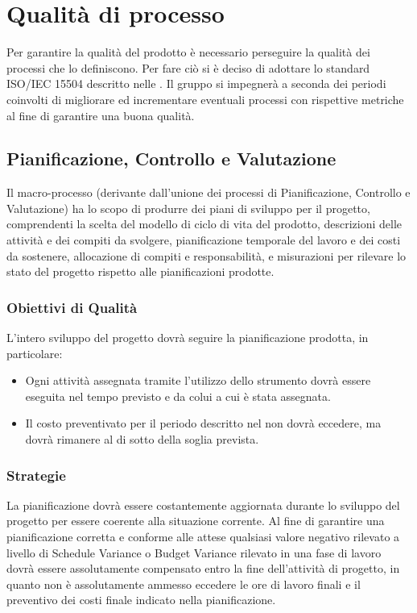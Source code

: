 \newpage

\section{Qualità di processo}
Per garantire la qualità del prodotto è necessario perseguire la qualità dei processi che lo definiscono. Per fare ciò si è deciso di adottare lo standard ISO/IEC 15504 descritto nelle \NdP. Il gruppo \gruppo{} si impegnerà a seconda dei periodi coinvolti di migliorare ed incrementare eventuali processi con rispettive metriche al fine di garantire una buona qualità.


\subsection{Pianificazione, Controllo e Valutazione}
Il macro-processo (derivante dall’unione dei processi di Pianificazione, Controllo e Valutazione) ha lo scopo di produrre dei piani di sviluppo per il progetto, comprendenti
la scelta del modello di ciclo di vita del prodotto, descrizioni delle attività e dei compiti
da svolgere, pianificazione temporale del lavoro e dei costi da sostenere, allocazione di compiti e
responsabilità, e misurazioni per rilevare lo stato del progetto rispetto alle pianificazioni prodotte.

\subsubsection{Obiettivi di Qualità}
L'intero sviluppo del progetto dovrà seguire la pianificazione prodotta, in particolare:

\begin{itemize}
\item Ogni attività assegnata tramite l'utilizzo dello strumento  dovrà essere eseguita nel tempo previsto e da colui a cui è stata assegnata.
\item Il costo preventivato per il periodo descritto nel \PdP{} non dovrà eccedere, ma dovrà rimanere al di sotto della soglia prevista.
\end{itemize}

\subsubsection{Strategie}
La pianificazione dovrà essere costantemente aggiornata durante lo sviluppo del progetto per essere coerente alla situazione corrente. Al fine di garantire una pianificazione corretta e conforme alle attese qualsiasi valore negativo rilevato a livello di Schedule Variance o Budget Variance rilevato in una fase di lavoro dovrà essere
assolutamente compensato entro la fine dell’attività di progetto, in quanto non è assolutamente
ammesso eccedere le ore di lavoro finali e il preventivo dei costi finale indicato nella pianificazione.

